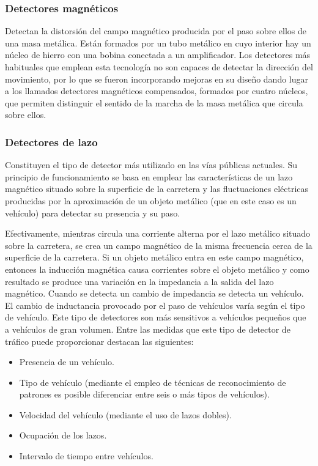 \subsubsection{Detectores magnéticos}
Detectan la distorsión del campo magnético producida por el paso sobre ellos de una masa metálica. Están formados por un 
tubo metálico en cuyo interior hay un núcleo de hierro con una bobina conectada a un amplificador. Los detectores más 
habituales que emplean esta tecnología no son capaces de detectar la dirección del movimiento, por lo que se fueron 
incorporando mejoras en su diseño dando lugar a los llamados detectores magnéticos compensados, formados por cuatro 
núcleos, que permiten distinguir el sentido de la marcha de la masa metálica que circula sobre ellos\cite{14}.
\subsubsection{Detectores de lazo}
Constituyen el tipo de detector más utilizado en las vías públicas actuales. Su principio de funcionamiento se basa en emplear 
las características de un lazo magnético situado sobre la superficie de la carretera y las fluctuaciones eléctricas producidas 
por la aproximación de un objeto metálico (que en este caso es un vehículo) para detectar su presencia y su paso. 

Efectivamente, mientras circula una corriente alterna por el lazo metálico situado sobre la carretera, se crea un campo magnético 
de la misma frecuencia cerca de la superficie de la carretera. Si un objeto metálico entra en este campo magnético, entonces la 
inducción magnética causa corrientes sobre el objeto metálico y como resultado se produce una variación en la impedancia a la 
salida del lazo magnético. Cuando se detecta un cambio de impedancia se detecta un vehículo. El cambio de inductancia provocado 
por el paso de vehículos varía según el tipo de vehículo. Este tipo de detectores son más sensitivos a vehículos pequeños que a 
vehículos de gran volumen. Entre las medidas que este tipo de detector de tráfico puede proporcionar destacan las siguientes:
\begin{itemize}
    \item Presencia de un vehículo.
    \item Tipo de vehículo (mediante el empleo de técnicas de reconocimiento de patrones es posible diferenciar entre seis o más tipos de vehículos).
    \item Velocidad del vehículo (mediante el uso de lazos dobles).
    \item Ocupación de los lazos.
    \item Intervalo de tiempo entre vehículos.
\end{itemize}


